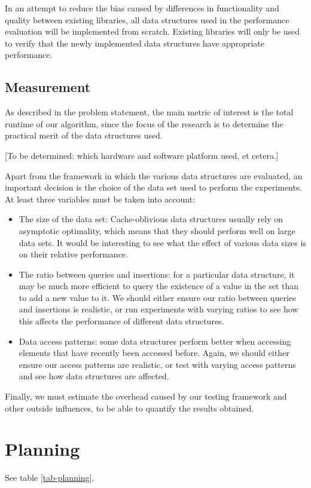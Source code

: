 \documentclass{acm_proc_article-sp}
\begin{document}
In an attempt to reduce the bias caused by differences in functionality and quality between existing libraries, all data structures used in the performance evaluation will be implemented from scratch. Existing libraries will only be used to verify that the newly implemented data structures have appropriate performance.

\subsection{Measurement}
As described in the problem statement, the main metric of interest is the total runtime of our algorithm, since the focus of the research is to determine the practical merit of the data structures used.

[To be determined: which hardware and software platform used, et cetera.]

Apart from the framework in which the various data structures are evaluated, an important decision is the choice of the data set used to perform the experiments. At least three variables must be taken into account:
\begin{itemize}
\item The size of the data set: Cache-oblivious data structures usually rely on asymptotic optimality, which means that they should perform well on large data sets. It would be interesting to see what the effect of various data sizes is on their relative performance.
\item The ratio between queries and insertions: for a particular data structure, it may be much more efficient to query the existence of a value in the set than to add a new value to it. We should either ensure our ratio between queries and insertions is realistic, or run experiments with varying ratios to see how this affects the performance of different data structures.
\item Data access patterns: some data structures perform better when accessing elements that have recently been accessed before. Again, we should either ensure our access patterns are realistic, or test with varying access patterns and see how data structures are affected.
\end{itemize}

Finally, we must estimate the overhead caused by our testing framework and other outside influences, to be able to quantify the results obtained.

\section{Planning}
See table \ref{tab-planning}.
\end{document}
